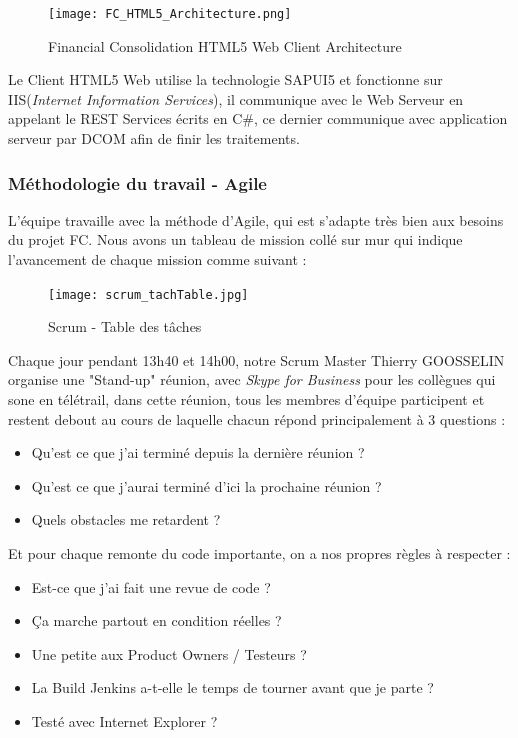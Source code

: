     \begin{figure}[H]
        \centering
        \texttt{[image: FC\_HTML5\_Architecture.png]}
        \caption{Financial Consolidation HTML5 Web Client Architecture}
        \label{fig:FC_HTML5_Architecture_label}
    \end{figure}
    
    \par Le Client HTML5 Web utilise la technologie SAPUI5 et fonctionne sur IIS(\textit{Internet Information Services}), il communique avec le Web Serveur en appelant le REST Services écrits en C\#, ce dernier communique avec application serveur par DCOM afin de finir les traitements.
    
    \subsubsection{Méthodologie du travail - Agile}
    L'équipe travaille avec la méthode d'Agile, qui est s'adapte très bien aux besoins du projet FC. Nous avons un tableau de mission collé sur mur qui indique l'avancement de chaque mission comme suivant : 
    \begin{figure}[H]
        \centering
        \texttt{[image: scrum\_tachTable.jpg]}
        \caption{Scrum - Table des tâches}
        \label{fig:scrum_figure}
    \end{figure}
    \par Chaque jour pendant 13h40 et 14h00, notre Scrum Master Thierry GOOSSELIN organise une "Stand-up" réunion, avec \textit{Skype for Business} pour les collègues qui sone en télétrail, dans cette réunion, tous les membres d'équipe participent et restent debout au cours de laquelle chacun répond principalement à 3 questions : 
    \begin{itemize}[label=\textbullet]
        \item Qu'est ce que j'ai terminé depuis la dernière réunion ?
        \item Qu'est ce que j'aurai terminé d'ici la prochaine réunion ?
        \item Quels obstacles me retardent ?
    \end{itemize}
    
    \par Et pour chaque remonte du code importante, on a nos propres règles à respecter : 
    \begin{itemize}[label=\textbullet]
        \item Est-ce que j'ai fait une revue de code ?
        \item Ça marche partout en condition réelles ?
        \item Une petite aux Product Owners / Testeurs ?
        \item La Build Jenkins a-t-elle le temps de tourner avant que je parte ?
        \item Testé avec Internet Explorer ?
    \end{itemize}

